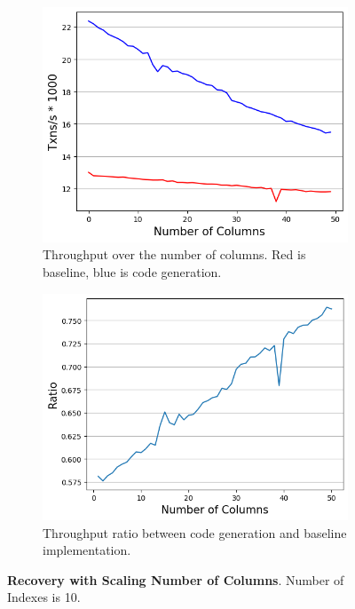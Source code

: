 \documentclass[12pt]{cmuthesis}
\begin{document}
\begin{figure}[ht!]
\centering
\begin{subfigure}{.44\textwidth}
 \centering
 \includegraphics[width=1.0\textwidth]{images/ColumnRecoveryIndex.png}
 \caption{Throughput over the number of columns. Red is baseline, blue is code generation.}
  \label{fig:col_recovery_throughput_index}
\end{subfigure}%
\begin{subfigure}{.45\textwidth}
 \centering
 \includegraphics[width=1.0\textwidth]{images/ColumnRecoveryIndexRatio.png}
 \caption{Throughput ratio between code generation and baseline implementation.}
  \label{fig:col_recovery_ratio_index}
\end{subfigure}
\caption{\textbf{Recovery with Scaling Number of Columns}. Number of Indexes is 10. }
\label{fig:col_recovery_throughput_index}
\end{figure}
\end{document}
